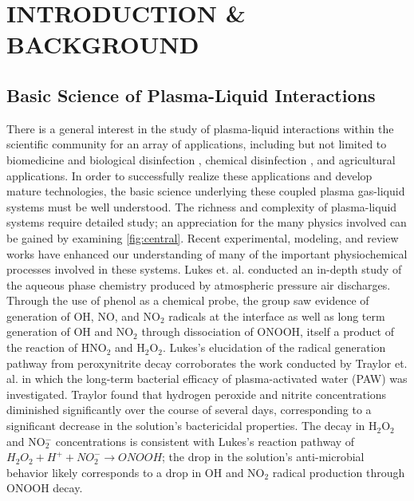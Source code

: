 \chapter{INTRODUCTION \& BACKGROUND}
\label{chap:intro}

\section{Basic Science of Plasma-Liquid Interactions}
\label{sec:intro_plasliq}

There is a general interest in the study of plasma-liquid interactions within the scientific community for an array of applications, including but not limited to biomedicine and biological disinfection \cite{Kong2009b,Laroussi2009,Shimizu2014c,VonWoedtke2014a,VonWoedtke2013a,Joubert2013a}, chemical disinfection \cite{Johnson2006,Locke2006,Theron2008}, and agricultural applications. \cite{Park2013b,Lindsay2014} In order to successfully realize these applications and develop mature technologies, the basic science underlying these coupled plasma gas-liquid systems must be well understood. The richness and complexity of plasma-liquid systems require detailed study; an appreciation for the many physics involved can be gained by examining \cref{fig:central}. Recent experimental, modeling, and review works have enhanced our understanding of many of the important physiochemical processes involved in these systems. Lukes et. al. \cite{Lukes2014b} conducted an in-depth study of the aqueous phase chemistry produced by atmospheric pressure air discharges. Through the use of phenol as a chemical probe, the group saw evidence of generation of OH, NO, and NO$_2$ radicals at the interface as well as long term generation of OH and NO$_2$ through dissociation of ONOOH, itself a product of the reaction of HNO$_2$ and H$_2$O$_2$. Lukes's elucidation of the radical generation pathway from peroxynitrite decay corroborates the work conducted by Traylor et. al. \cite{Traylor2011h} in which the long-term bacterial efficacy of plasma-activated water (PAW) was investigated. Traylor found that hydrogen peroxide and nitrite concentrations diminished significantly over the course of several days, corresponding to a significant decrease in the solution's bactericidal properties. The decay in H$_2$O$_2$ and NO$_2^-$ concentrations is consistent with Lukes's reaction pathway of $H_2O_2 + H^+ + NO_2^- \rightarrow ONOOH$; the drop in the solution's anti-microbial behavior likely corresponds to a drop in OH and NO$_2$ radical production through ONOOH decay.

